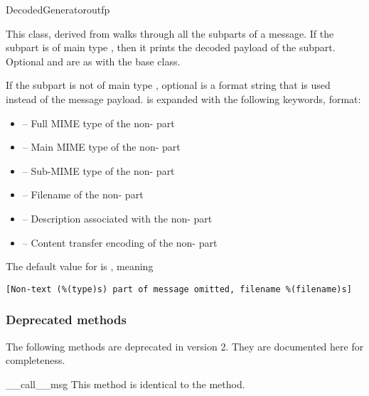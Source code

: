 \begin{classdesc}{DecodedGenerator}{outfp}

This class, derived from  walks through all the
subparts of a message.  If the subpart is of main type
, then it prints the decoded payload of the subpart.
Optional  and  are as with the
 base class.

If the subpart is not of main type , optional 
is a format string that is used instead of the message payload.
 is expanded with the following keywords, 
format:

\begin{itemize}
\item {} -- Full MIME type of the non- part
\item {} -- Main MIME type of the non- part
\item {} -- Sub-MIME type of the non- part
\item {} -- Filename of the non- part
\item {} -- Description associated with the
      non- part
\item {} -- Content transfer encoding of the
      non- part
\end{itemize}

The default value for  is , meaning

\begin{verbatim}
[Non-text (%(type)s) part of message omitted, filename %(filename)s]
\end{verbatim}

\end{classdesc}

\subsubsection{Deprecated methods}

The following methods are deprecated in  version 2.
They are documented here for completeness.

\begin{methoddesc}[Generator]{__call__}{msg}
This method is identical to the  method.

\end{methoddesc}
